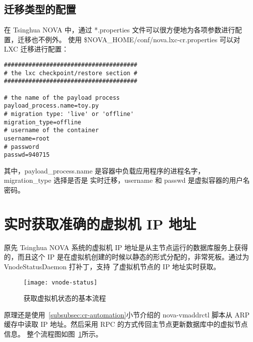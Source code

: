 \subsection{迁移类型的配置}

在 Tsinghua NOVA 中，通过 *.properties 文件可以很方便地为各项参数进行配置，迁移也不例外。
使用 \$NOVA\_HOME/conf/nova.lxc-cr.properties 可以对 LXC 迁移进行配置：

\begin{lstlisting}
######################################
# the lxc checkpoint/restore section #
######################################

# the name of the payload process
payload_process.name=toy.py
# migration type: 'live' or 'offline'
migration_type=offline
# username of the container
username=root
# password
passwd=940715
\end{lstlisting}

其中，payload\_process.name 是容器中负载应用程序的进程名字，migration\_type 选择是否是
实时迁移，username 和 passwd 是虚拟容器的用户名密码。

\section{实时获取准确的虚拟机 IP 地址}

原先 Tsinghua NOVA 系统的虚拟机 IP 地址是从主节点运行的数据库服务上获得的，而且这个 IP
是在虚拟机创建的时候以静态的形式分配的，非常死板。通过为 VnodeStatusDaemon 打补丁，支持
了虚拟机节点的 IP 地址实时获取。

\begin{figure}[h]
    \centering
    \texttt{[image: vnode-status]}
    \caption{获取虚拟机状态的基本流程}
    \label{fig:vnode-status}
\end{figure}

原理还是使用~\ref{subsubsec:cr-automation}小节介绍的 nova-vmaddrctl 脚本从 ARP 缓存中读取 IP
地址。然后采用 RPC 的方式传回主节点更新数据库中的虚拟节点信息。
整个流程图如图~\ref{fig:vnode-status}所示。
